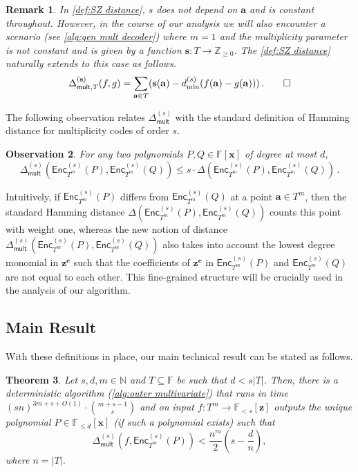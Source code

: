 \documentclass{article}
\newtheorem{theorem}{Theorem}\newtheorem{lemma}[theorem]{Lemma}\newtheorem{proposition}[theorem]{Proposition}\newtheorem{corollary}[theorem]{Corollary}\newtheorem{definition}[theorem]{Definition}\newtheorem{claim}[theorem]{Claim}\newtheorem{remark}[theorem]{Remark}\newtheorem{observation}[theorem]{Observation}
\def\Integer{\mathbb{Z}}
\def\Natural{\mathbb{N}}
\def\Field{\mathbb{F}}
\let\N\Natural
\let\Z\Integer
\let\F\Field
\def\abs#1{\left| #1 \right|}
\def\veca{\mathbf{a}}
\def\vece{\mathbf{e}}
\def\vecx{\mathbf{x}}
\def\vecz{\mathbf{z}}
\newcommand{\encst}{{\mathsf{Enc}_{T^m}^{(s)}}}
\newcommand{\Del}{\Delta}
\newcommand{\Delm}{\Delta_{\mathsf{mult}}}
\newcommand{\vz}{\vecz}
\newcommand{\vx}{\vecx}
\newcommand{\ve}{\vece}
\newcommand{\va}{\veca}
\newcommand{\sbar}{\mathbf{s}}
\begin{document}
	\begin{remark}\label{rmk:Delm for non-constant s}
		In \cref{def:SZ distance}, $s$ does not depend on $\va$ and is
		constant throughout. However, in the course of our analysis we will
		also encounter a scenario (see \cref{alg:gen mult decoder}) where $m =
		1$ and the multiplicity parameter is not constant and is given by a
		function $\sbar\colon T \to \Z_{\geq 0}$. The \cref{def:SZ distance} naturally extends to this case as follows.
		\[ \Delta_{\mathsf{mult}, T}^{(\sbar)} (f, g) = \sum_{\va \in T} (\sbar(\va) - d^{(s)}_{\min}(f(\va) - g(\va)))\,.\qedhere\]
	\end{remark}
	
	
	The following observation relates $\Delm^{(s)}$ with the standard definition of Hamming distance for multiplicity codes of order $s$. 
	\begin{observation}\label{obs:delm vs del}
		For any two polynomials $P, Q \in \F[\vx]$ of degree at most $d$, 
		\[
		\Delm^{(s)}(\encst(P), \encst(Q)) \leq s\cdot \Del(\encst(P), \encst(Q)) \, .
		\]
	\end{observation}
	Intuitively, if $\encst(P)$ differs from $\encst(Q)$ at a point 
	$\va \in T^m$, then the standard Hamming distance $\Del(\encst(P), \encst(Q))$ counts this point with weight one, whereas the new notion of distance $\Delm^{(s)}(\encst(P), \encst(Q))$ also takes into account 
	the lowest degree monomial in $\vz^{\ve}$ such that the coefficients of $\vz^{\ve}$ in $\encst(P)$ and $\encst(Q)$ are not equal to each other. This fine-grained structure will be crucially used in the analysis of our algorithm. 
	
	\subsection{Main Result}
	
	With these definitions in place, our main technical result can be stated as follows. 

	\begin{theorem}\label{thm:main tech result}
		Let $s, d, m \in \N$ and $T \subseteq \F$ be such that $d <
		s|T|$. Then, there is a deterministic algorithm (\cref{alg:outer multivariate})
		that runs in time $(sn)^{3m + s + O(1)}\cdot \binom{m+s-1}{s}$ and on input
		$f\colon T^m \to \mathbb{F}_{<s}[\vz]$ outputs the unique polynomial
		$P \in \mathbb{F}_{\leq d}[\vx]$ (if such a polynomial exists) such
		that
		\[\Delm^{(s)}(f, \encst(P)) < \frac{n^m}{2}\left(s-\frac{d}{n}\right),\]
		where $n = \abs{T}$.
	\end{theorem}
\end{document}
